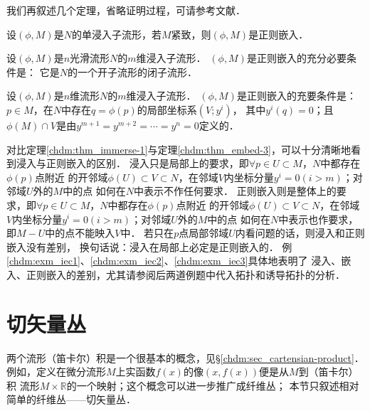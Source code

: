 我们再叙述几个定理，省略证明过程，可请参考文献\parencite[\S 1.3]{cc2001-zh}．

\begin{theorem}\label{chdm:thm_embed-1}
    设$(\phi,M)$是$N$的单浸入子流形，若$M$紧致，则$(\phi,M)$是正则嵌入．
\end{theorem}

\begin{theorem}\label{chdm:thm_embed-2}
    设$(\phi,M)$是$n$光滑流形$N$的$m$维浸入子流形．
    $(\phi,M)$是正则嵌入的充分必要条件是：
    它是$N$的一个开子流形的闭子流形．
\end{theorem}

\begin{theorem}\label{chdm:thm_embed-3}
    设$(\phi,M)$是$n$维流形$N$的$m$维浸入子流形．
    $(\phi,M)$是正则嵌入的充要条件是：
    $p\in M$，在$N$中存在$q=\phi(p)$的局部坐标系$(V;y^i)$，
    其中$y^i(q)=0$；且$\phi(M)\cap V$是由$y^{m+1}=y^{m+2}=\cdots=y^{n}=0$定义的．
\end{theorem}

对比定理\ref{chdm:thm_immerse-1}与定理\ref{chdm:thm_embed-3}，可以十分清晰地看到浸入与正则嵌入的区别．
浸入只是局部上的要求，即$\forall p\in U\subset M$，$N$中都存在$\phi(p)$点附近
的开邻域$\phi(U)\subset V\subset N$，在邻域$V$内坐标分量$y^i=0(i>m)$；对邻域$U$外的$M$中的点
如何在$N$中表示不作任何要求．
正则嵌入则是整体上的要求，即$\forall p\in U\subset M$，$N$中都存在$\phi(p)$点附近
的开邻域$\phi(U)\subset V\subset N$，在邻域$V$内坐标分量$y^i=0(i>m)$；对邻域$U$外的$M$中的点
如何在$N$中表示也作要求，即$M-U$中的点不能映入$V$中．
若只在$p$点局部邻域$U$内看问题的话，则浸入和正则嵌入没有差别，
换句话说：浸入{\kaishu 在局部上}必定是正则嵌入的．
例\ref{chdm:exm_iec1}、\ref{chdm:exm_iec2}、\ref{chdm:exm_iec3}具体地表明了
浸入、嵌入、正则嵌入的差别，尤其请参阅后两道例题中代入拓扑和诱导拓扑的分析．






\section{切矢量丛}\label{chdm:sec_tangent-bundles}
两个流形（笛卡尔）积是一个很基本的概念，见\S \ref{chdm:sec_cartensian-product}．
例如，定义在微分流形$M$上实函数$f(x)$的像$(x,f(x))$便是从$M$到（笛卡尔）积
流形$M\times \mathbb{R}$的一个映射；这个概念可以进一步推广成{\kaishu 纤维丛}；
本节只叙述相对简单的纤维丛——切矢量丛．


